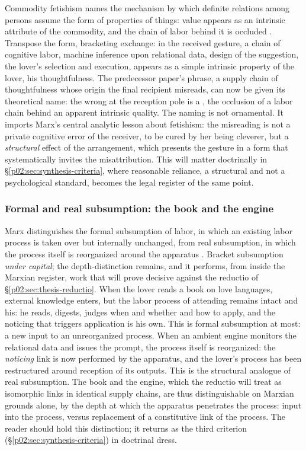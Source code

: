 Commodity fetishism names the mechanism by which definite relations among persons assume the form of properties of things: value appears as an intrinsic attribute of the commodity, and the chain of labor behind it is occluded \parencite{marx1867capital}. Transpose the form, bracketing exchange: in the received gesture, a chain of cognitive labor, machine inference upon relational data, design of the suggestion, the lover's selection and execution, appears as a simple intrinsic property of the lover, his thoughtfulness. The predecessor paper's phrase, a supply chain of thoughtfulness whose origin the final recipient misreads, can now be given its theoretical name: the wrong at the reception pole is a , the occlusion of a labor chain behind an apparent intrinsic quality. The naming is not ornamental. It imports Marx's central analytic lesson about fetishism: the misreading is not a private cognitive error of the receiver, to be cured by her being cleverer, but a \emph{structural} effect of the arrangement, which presents the gesture in a form that systematically invites the misattribution. This will matter doctrinally in \S\ref{p02:sec:synthesis-criteria}, where reasonable reliance, a structural and not a psychological standard, becomes the legal register of the same point.

\subsubsection{Formal and real subsumption: the book and the engine}
\label{p02:sec:marx-subsumption}

Marx distinguishes the formal subsumption of labor, in which an existing labor process is taken over but internally unchanged, from real subsumption, in which the process itself is reorganized around the apparatus \parencite{marx1864results}. Bracket subsumption \emph{under capital}; the depth-distinction remains, and it performs, from inside the Marxian register, work that will prove decisive against the reductio of \S\ref{p02:sec:thesis-reductio}. When the lover reads a book on love languages, external knowledge enters, but the labor process of attending remains intact and his: he reads, digests, judges when and whether and how to apply, and the noticing that triggers application is his own. This is formal subsumption at most: a new input to an unreorganized process. When an ambient engine monitors the relational data and issues the prompt, the process itself is reorganized: the \emph{noticing} link is now performed by the apparatus, and the lover's process has been restructured around reception of its outputs. This is the structural analogue of real subsumption. The book and the engine, which the reductio will treat as isomorphic links in identical supply chains, are thus distinguishable on Marxian grounds alone, by the depth at which the apparatus penetrates the process: input into the process, versus replacement of a constitutive link of the process. The reader should hold this distinction; it returns as the third criterion (\S\ref{p02:sec:synthesis-criteria}) in doctrinal dress.

